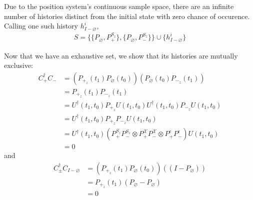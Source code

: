 Due to the position system's continuous sample space, there are an infinite number of histories distinct from the initial state with zero chance of occurence. Calling one such history $h_{I-\varnothing}^i$,
\begin{align}
  S = \{\{ P_\varnothing, P^{S_z}_+ \}, \{P_\varnothing, P^{S_z}_- \} \} \cup \{h_{I-\varnothing}^i\}
\end{align}

Now that we have an exhaustive set, we show that its histories are mutually exclusive:
\begin{align}
  C_+^\dagger C_- &= \left( P_{+_z}(t_1)  P_\varnothing(t_0) \right) \left(P_\varnothing(t_0) P_{-_z}(t_1) \right) \\ \nonumber
  &= P_{+_z}(t_1) P_{-_z}(t_1) \\ \nonumber
  &= U^\dagger(t_1, t_0) P_{+_z} U(t_1, t_0) U^\dagger(t_1, t_0) P_{-_z} U(t_1, t_0)  \\ \nonumber
  &= U^\dagger(t_1, t_0) P_{+_z}P_{-_z} U(t_1, t_0) \\ \nonumber
  &= U^\dagger(t_1, t_0) \left( P^{S_z}_+ P^{S_z}_-  \otimes P^\mathcal{X}_+ P^\mathcal{X}_- \otimes P^\epsilon_+ P^\epsilon_- \right) U(t_1, t_0) \\ \nonumber
  &= 0
\end{align}
and
\begin{align}
  C_\pm^\dagger C_{I-\varnothing} &= \left( P_{+_z}(t_1)  P_\varnothing(t_0) \right) \left( \left(I-P_\varnothing\right) \right) \\ \nonumber
  &= P_{+_z}(t_1)  \left(P_\varnothing - P_\varnothing \right)\\ \nonumber
  &= 0
\end{align}

